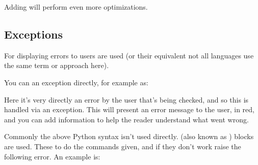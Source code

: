 \documentclass[letterpaper,10pt,british]{sphinxmanual}
\begin{document}
\sphinxAtStartPar
Adding  will perform even more optimizations.


\subsection{Exceptions}
\label{\detokenize{chapters/programming_fundamentals/asserts_and_exceptions:exceptions}}
\sphinxAtStartPar
For displaying errors to users  are used (or their equivalent \sphinxhyphen{} not all languages use the same term or approach here).

\sphinxAtStartPar
You can  an exception directly, for example as:

\begin{sphinxVerbatim}[commandchars=\\\{\}]
    
    

   
     
\end{sphinxVerbatim}

\sphinxAtStartPar
Here it’s very directly an error by the user that’s being checked, and so this is handled via an exception. This will present an error message to the user, in red, and you can add information to help the reader understand what went wrong.

\sphinxAtStartPar
Commonly the above Python syntax isn’t used directly.  (also known as ) blocks are used. These  to do the commands given, and if they don’t work raise the following error. An example is:
\end{document}
